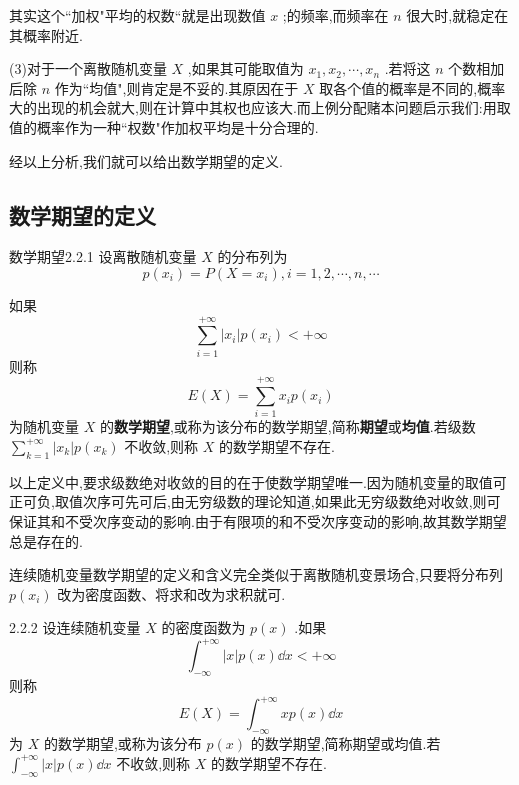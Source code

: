 其实这个``加权"平均的权数``就是出现数值 $ x $ ;的频率,而频率在 $ n $ 很大时,就稳定在其概率附近.

(3)对于一个离散随机变量 $ X $ ,如果其可能取值为 $ x_{1}, x_{2}, \cdots, x_{n} $ .若将这 $ n $ 个数相加后除 $ n $ 作为``均值",则肯定是不妥的.其原因在于 $ X $ 取各个值的概率是不同的,概率大的出现的机会就大,则在计算中其权也应该大.而上例分配赌本问题启示我们:用取值的概率作为一种``权数"作加权平均是十分合理的.

经以上分析,我们就可以给出数学期望的定义.

\subsection{数学期望的定义}\label{ssec:2.2.2}

\begin{definition}{数学期望}{2.2.1}
	设离散随机变量 $ X $ 的分布列为	
	\[ 
	p\left(x_{i}\right)=P\left(X=x_{i}\right), i=1,2, \cdots, n, \cdots
	\]
	
	如果
	\[ 
	\sum_{i=1}^{+\infty}\left|x_{i}\right| p\left(x_{i}\right)<+\infty
	\]
	则称
	\begin{equation} 
	E(X)=\sum_{i=1}^{+\infty} x_{i} p\left(x_{i}\right) \label{eq:2.2.1}
	\end{equation}
	为随机变量 $ X $ 的\textbf{数学期望},或称为该分布的数学期望,简称\textbf{期望}或\textbf{均值}.若级数 $ \sum_{k=1}^{+\infty}\left|x_{k}\right| p\left(x_{k}\right) $ 不收敛,则称 $ X $ 的数学期望不存在.
\end{definition}

以上定义中,要求级数绝对收敛的目的在于使数学期望唯一.因为随机变量的取值可正可负,取值次序可先可后,由无穷级数的理论知道,如果此无穷级数绝对收敛,则可保证其和不受次序变动的影响.由于有限项的和不受次序变动的影响,故其数学期望总是存在的.

连续随机变量数学期望的定义和含义完全类似于离散随机变景场合,只要将分布列 $ p(x_i) $ 改为密度函数、将求和改为求积就可.

\begin{definition}{}{2.2.2}
	设连续随机变量 $ X $ 的密度函数为 $ p(x) $ .如果
	\[ 
	\int_{-\infty}^{+\infty}|x| p(x) \dd x<+\infty
	\]
	则称	
	\begin{equation} 
	E(X)=\int_{-\infty}^{+\infty} x p(x) \dd x \label{eq:2.2.2}
	\end{equation}
	为 $ X $ 的数学期望,或称为该分布 $ p(x) $ 的数学期望,简称期望或均值.若 $ \int_{-\infty}^{+\infty}|x| p(x) \dd x $ 不收敛,则称 $ X $ 的数学期望不存在.
	
\end{definition}

